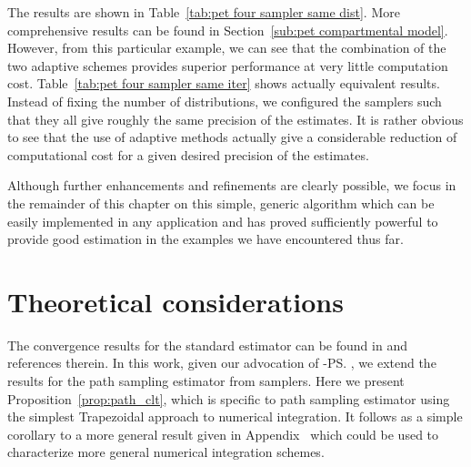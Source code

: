 

The results are shown in Table~\ref{tab:pet four sampler same dist}. More comprehensive results can be found in Section~\ref{sub:pet compartmental model}. However, from this particular example, we can see that the combination of the two adaptive schemes provides superior performance at very little computation cost. Table~\ref{tab:pet four sampler same iter} shows actually equivalent results. Instead of fixing the number of distributions, we configured the samplers such that they all give roughly the same precision of the estimates. It is rather obvious to see that the use of adaptive methods actually give a considerable reduction of computational cost for a given desired precision of the estimates.



Although further enhancements and refinements are clearly possible, we focus in the remainder of this chapter on this simple, generic algorithm which can be easily implemented in any application and has proved sufficiently powerful to provide good estimation in the examples we have encountered thus far.

\section{Theoretical considerations}
\label{sec:Theoretical considerations}

The convergence results for the standard estimator can be found in \cite{DelMoral:2006hc} and references therein. In this work, given our advocation of \smc[2]-\ps, we extend the results for the path sampling estimator from \smc samplers. Here we present Proposition~\ref{prop:path_clt}, which is specific to path sampling estimator using the simplest Trapezoidal approach to numerical integration. It follows as a simple corollary to a more general result given in Appendix~ which could be used to characterize more general numerical integration schemes.

